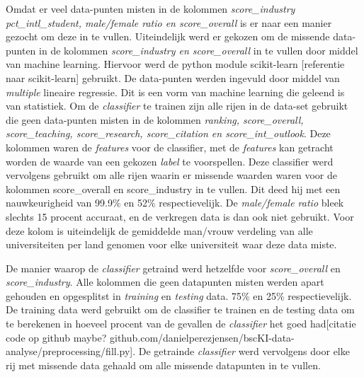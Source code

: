 \documentclass{uva-inf-article}
\begin{document}
Omdat er veel data-punten misten in de kolommen \textit{score\_industry} \textit{ pct\_intl\_student, male/female ratio en score\_overall} is er naar een manier gezocht om deze in te vullen. Uiteindelijk werd er gekozen om de missende data-punten in de kolommen \textit{score\_industry en score\_overall} in te vullen door middel van machine learning. Hiervoor werd de python module scikit-learn [referentie naar scikit-learn] gebruikt. De data-punten werden ingevuld door middel van \textit{multiple} lineaire regressie. Dit is een vorm van machine learning die geleend is van statistiek. Om de \textit{classifier} te trainen zijn alle rijen in de data-set gebruikt die geen data-punten misten in de kolommen \textit{ranking, score\_overall, score\_teaching, score\_research, score\_citation en score\_int\_outlook}. Deze kolommen waren de \textit{features} voor de classifier, met de \textit{features} kan  getracht worden de waarde van een gekozen \textit{label} te voorspellen. Deze classifier werd vervolgens gebruikt om alle rijen waarin er missende waarden waren voor de kolommen score\_overall en score\_industry in te vullen. Dit deed hij met een nauwkeurigheid van 99.9\% en 52\% respectievelijk. De \textit{male/female ratio} bleek slechts 15 procent accuraat, en de verkregen data is dan ook niet gebruikt. Voor deze kolom is uiteindelijk de gemiddelde man/vrouw verdeling van alle universiteiten per land genomen voor elke universiteit waar deze data miste.

De manier waarop de \textit{classifier} getraind werd hetzelfde voor \textit{score\_overall} en \textit{score\_industry}. Alle kolommen die geen datapunten misten werden apart gehouden en opgesplitst in \textit{training} en \textit{testing} data. 75\% en 25\% respectievelijk. De training data werd gebruikt om de classifier te trainen en de testing data om te berekenen in hoeveel procent van de gevallen de \textit{classifier} het goed had[citatie code op github maybe? github.com/danielperezjensen/bscKI-data-analyse/preprocessing/fill.py]. De getrainde \textit{classifier} werd vervolgens door elke rij met missende data gehaald om alle missende datapunten in te vullen.
\end{document}
